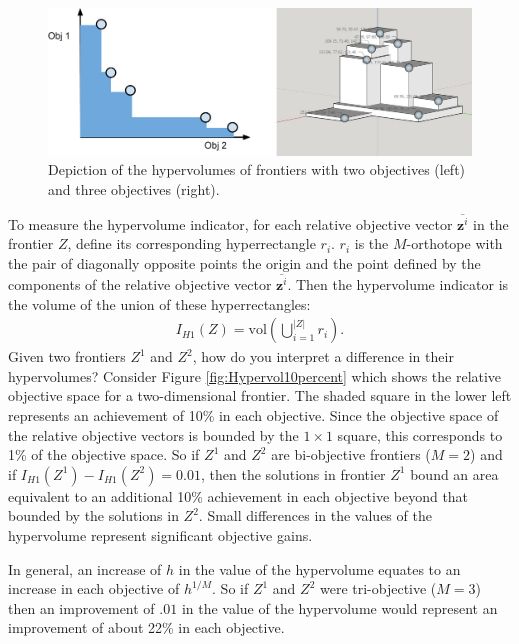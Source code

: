 \begin{figure}[ht]
\centering
\includegraphics[width=.85\textwidth]{../images/FrontierVolumesNo2DOutlines}
\caption[Hypervolume of Pareto frontiers]{Depiction of the hypervolumes of frontiers with two objectives (left) and three objectives (right).}
\label{fig:frontierVolumes}
\end{figure}

To measure the hypervolume indicator, for each relative objective vector $\overbar{\mathbf{z}^i}$ in the frontier $Z$, define its corresponding hyperrectangle $r_i$. $r_i$ is the $M$-orthotope with the pair of diagonally opposite points the origin and the point defined by the components of the relative objective vector $\overbar{\mathbf{z}^i}$. Then the hypervolume indicator is the volume of the union of these hyperrectangles:
\begin{align}
I_{H1}(Z) = \text{vol} \left( \bigcup_{i = 1}^{|Z|} r_i \right). \label{eqn:hypervol}
\end{align}
Given two frontiers $Z^1$ and $Z^2$, how do you interpret a difference in their hypervolumes? Consider Figure \ref{fig:Hypervol10percent} which shows the relative objective space for a two-dimensional frontier. The shaded square in the lower left represents an achievement of 10\% in each objective. Since the objective space of the relative objective vectors is bounded by the $1 \times 1$ square, this corresponds to 1\% of the objective space. So if $Z^1$ and $Z^2$ are bi-objective frontiers ($M=2$) and if $I_{H1}(Z^1) - I_{H1}(Z^2) = 0.01$, then the solutions in frontier $Z^1$ bound an area equivalent to an additional 10\% achievement in each objective beyond that bounded by the solutions in $Z^2$. Small differences in the values of the hypervolume represent significant objective gains.

In general, an increase of $h$ in the value of the hypervolume equates to an increase in each objective of $h^{1/M}$. So if $Z^1$ and $Z^2$ were tri-objective ($M=3$) then an improvement of $.01$ in the value of the hypervolume would represent an improvement of about 22\% in each objective.

